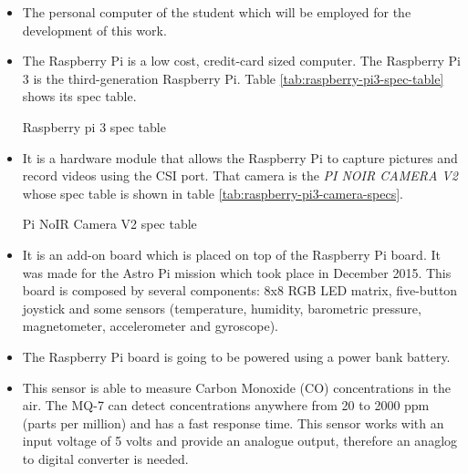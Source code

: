 \documentclass{pre-tfg}
\begin{document}
\begin{itemize}[noitemsep,nolistsep]
	\item {} The personal computer of the student which will be employed for the development of this work.
	
	\item {} The Raspberry Pi is a low cost, credit-card sized computer. The Raspberry Pi 3 is the third-generation Raspberry Pi. Table \ref{tab:raspberry-pi3-spec-table} shows its spec table.
	
	\begin{table}[!h]
		\centering
		{\small
			
		}
		\caption{Raspberry pi 3 spec table}
		\label{tab:raspberry-pi3-spec-table}
	\end{table}
	
	\item {} It is a hardware module that allows the Raspberry Pi to capture pictures and record videos using the CSI port. That camera is the \emph{PI NOIR CAMERA V2} whose spec table is shown in table \ref{tab:raspberry-pi3-camera-specs}. \label{itm:Pi-camera-module-v2}
	
	\begin{table}[!h]
		\centering
		{\small
			
		}
		\caption{Pi NoIR Camera V2 spec table}
		\label{tab:raspberry-pi3-camera-specs}
	\end{table}
	
	\item {} It is an add-on board which is placed on top of the Raspberry Pi board. It was made for the Astro Pi mission which took place in December 2015. This board is composed by several components: 8x8 RGB LED matrix, five-button joystick and some sensors (temperature, humidity, barometric pressure, magnetometer, accelerometer and gyroscope).
	
	\item {} The Raspberry Pi board is going to be powered using a power bank battery.
	
	\item {} This sensor is able to measure Carbon Monoxide (CO) concentrations in the air. The MQ-7 can detect concentrations anywhere from 20 to 2000 ppm (parts per million) and has a fast response time. This sensor works with an input voltage of 5 volts and provide an analogue output, therefore an anaglog to digital converter is needed.
	

\end{itemize}
\end{document}
